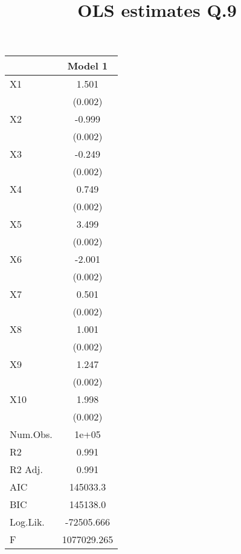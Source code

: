 \documentclass{article}
\begin{document}
\begin{table}[hbt!]
\centering
\begin{center}
    \title{OLS estimates Q.9}
\end{center}
\begin{tabular}[t]{lc}
\toprule
  & Model 1\\
\midrule
X1 & 1.501\\
 & \vphantom{9} (0.002)\\
X2 & -0.999\\
 & \vphantom{8} (0.002)\\
X3 & -0.249\\
 & \vphantom{7} (0.002)\\
X4 & 0.749\\
 & \vphantom{6} (0.002)\\
X5 & 3.499\\
 & \vphantom{5} (0.002)\\
X6 & -2.001\\
 & \vphantom{4} (0.002)\\
X7 & 0.501\\
 & \vphantom{3} (0.002)\\
X8 & 1.001\\
 & \vphantom{2} (0.002)\\
X9 & 1.247\\
 & \vphantom{1} (0.002)\\
X10 & 1.998\\
 & (0.002)\\
\midrule
Num.Obs. & 1e+05\\
R2 & 0.991\\
R2 Adj. & 0.991\\
AIC & 145033.3\\
BIC & 145138.0\\
Log.Lik. & -72505.666\\
F & 1077029.265\\
\bottomrule
\end{tabular}
\end{table}
\end{document}
